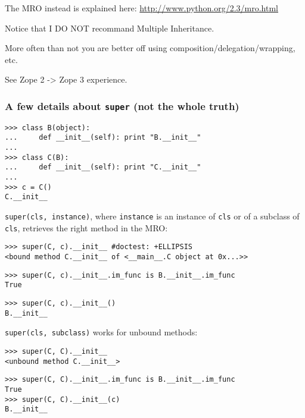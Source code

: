 \documentclass[10pt,a4paper,english]{article}
\begin{document}
The MRO instead is explained here: \href{http://www.python.org/2.3/mro.html}{http://www.python.org/2.3/mro.html}

Notice that I DO NOT recommand Multiple Inheritance.

More often than not you are better off using composition/delegation/wrapping, 
etc.

See Zope 2 -{\textgreater} Zope 3 experience.



\hypertarget{a-few-details-about-super-not-the-whole-truth}{}
\subsubsection*{A few details about \texttt{super} (not the whole truth)}
\begin{verbatim}>>> class B(object):
...     def __init__(self): print "B.__init__"
...
>>> class C(B):
...     def __init__(self): print "C.__init__"
...
>>> c = C()
C.__init__\end{verbatim}

\texttt{super(cls, instance)}, where \texttt{instance} is an instance of \texttt{cls} or of
a subclass of \texttt{cls}, retrieves the right method in the MRO:
\begin{verbatim}>>> super(C, c).__init__ #doctest: +ELLIPSIS
<bound method C.__init__ of <__main__.C object at 0x...>>\end{verbatim}
\begin{verbatim}>>> super(C, c).__init__.im_func is B.__init__.im_func
True\end{verbatim}
\begin{verbatim}>>> super(C, c).__init__()
B.__init__\end{verbatim}

\texttt{super(cls, subclass)} works for unbound methods:
\begin{verbatim}>>> super(C, C).__init__
<unbound method C.__init__>\end{verbatim}
\begin{verbatim}>>> super(C, C).__init__.im_func is B.__init__.im_func
True
>>> super(C, C).__init__(c)
B.__init__\end{verbatim}
\end{document}
